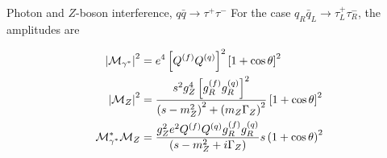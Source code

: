 \documentclass{../bredelebeamer}
\begin{document}
\begin{frame}{Photon and $Z$-boson interference, $q \bar q \longrightarrow \tau^+ \tau^- $}
    For the case $q_R \bar q_L \longrightarrow \tau_L^+ \tau_R^-$, the amplitudes are
    \begin{minipage}{0.65\textwidth}
        \begin{equation}
            \begin{aligned}
                \abs{\mathcal{M}_{\gamma^*}}^2          & = e^4\left[Q^{(f)} Q^{(q)}\right]^2\left[1+\cos \theta\right]^2                                                                      \\
                \abs{\mathcal{M}_{Z}}^2                 & = \frac{s^2 g_Z^4\left[g_R^{(f)} g_R^{(q)}\right]^2}{\left(s-m_Z^2\right)^2+\left(m_Z \Gamma_Z\right)^2}\left[1+\cos \theta\right]^2 \\
                \mathcal{M}_{\gamma^*}^*\mathcal{M}_{Z} & = \frac{g_Z^2 e^2 Q^{(f)} Q^{(q)} g_R^{(f)} g_R^{(q)}}{\left(s-m_Z^2+i \Gamma_Z\right)} s\left(1+\cos \theta\right)^2 \notag
            \end{aligned}
        \end{equation}
    \end{minipage}
    \hfill
    \begin{minipage}{0.33\textwidth}
    \end{minipage}


\end{frame}
\end{document}
